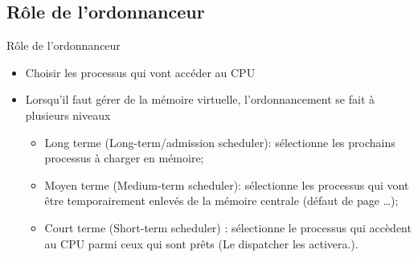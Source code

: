 \begin{frame}{\sectitle}
\def\subsectitle{Rôle de l'ordonnanceur}
\subsection{\subsectitle}

\begin{block}{\subsectitle}
\begin{itemize}
    \item Choisir les processus qui vont accéder au CPU
    \item Lorsqu'il faut gérer de la mémoire virtuelle, l'ordonnancement se
    fait à plusieurs niveaux
    \begin{itemize}
        \item Long terme (Long-term/admission scheduler): sélectionne les prochains
        processus à charger en mémoire;
        \item Moyen terme (Medium-term scheduler): sélectionne les processus qui
        vont être temporairement enlevés de la mémoire centrale (défaut de
        page \dots);
        \item Court terme (Short-term scheduler) : sélectionne le processus qui
        accèdent au CPU parmi ceux qui sont prêts (Le dispatcher les activera.).
    \end{itemize}
\end{itemize}
\end{block}
\end{frame}

